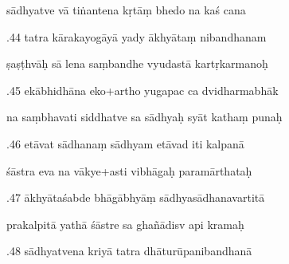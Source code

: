 \documentclass[article,12pt,a4paper]{memoir}%
\newcounter{parCount}
\begin{document}
	  
	  \pstart \leavevmode%
	sādhyatve vā tiṅantena kṛtāṃ bhedo na kaś cana 
	{}
	\pend%
      

	  
	  \pstart {}.44 tatra kārakayogāyā yady ākhyātaṃ nibandhanam 
	{}
	\pend%
      

	  
	  \pstart \leavevmode%
	ṣaṣṭhvāḥ sā lena saṃbandhe vyudastā kartṛkarmanoḥ 
	{}
	\pend%
      

	  
	  \pstart {}.45 ekābhidhāna eko+artho yugapac ca dvidharmabhāk 
	{}
	\pend%
      

	  
	  \pstart \leavevmode%
	na saṃbhavati siddhatve sa sādhyaḥ syāt kathaṃ punaḥ 
	{}
	\pend%
      

	  
	  \pstart {}.46 etāvat sādhanaṃ sādhyam etāvad iti kalpanā 
	{}
	\pend%
      

	  
	  \pstart \leavevmode%
	śāstra eva na vākye+asti vibhāgaḥ paramārthataḥ 
	{}
	\pend%
      

	  
	  \pstart {}.47 ākhyātaśabde bhāgābhyāṃ sādhyasādhanavartitā 
	{}
	\pend%
      

	  
	  \pstart \leavevmode%
	prakalpitā yathā śāstre sa ghañādisv api kramaḥ 
	{}
	\pend%
      

	  
	  \pstart {}.48 sādhyatvena kriyā tatra dhāturūpanibandhanā 
	{}
	\pend%
      
\end{document}
